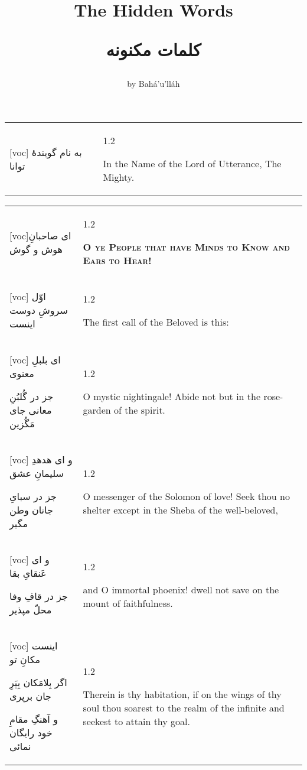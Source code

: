 \documentclass[11pt]{article}
\title{
\Huge
\vspace*{2in}
The Hidden Words \\
\vspace{.25in}
\fontsize{48}{36}
\begin{arab}
کلمات مکنونه
\end{arab}
\vspace{1in}}
\author{\LARGE by Bahá’u’lláh}
\date{}
\makeatletter
\newenvironment{orig}
  {\begin{farsi}[voc]}
  {\end{farsi}}
\newenvironment{trans}
  {\Large\begin{spacing}{1.2}\raggedright}
  {\end{spacing}}
\newenvironment{word}
  {\begin{tabular}[t]{p{2.75in}@{\hspace{3em}}p{2.75in}}}
  {\end{tabular}}
\newcommand{\ayat}[2]{\begin{orig}#1\end{orig} & \begin{trans}#2\end{trans}}
\newcommand{\heading}[2]{\textsc{\textbf{#1}} %
}
\makeatother
\begin{document}
\maketitle
\thispagestyle{empty}

\newpage

\fontsize{24}{32}

\vspace*{3in}

\begin{word}
\ayat{
به نام گویندۀ توانا
}{
In the Name of the Lord of Utterance, The Mighty.
}
\end{word}

\pagebreak

\begin{word}
\ayat{ای صاحبانِ هوش و گوش}{\heading{
  O ye People that have Minds to Know and Ears to Hear!}{}} \\ \ayat{
اوّل سروشِ دوست اینست
}{The first call of the Beloved is this:} \vspace{-1ex}\\ \ayat{
ای بلبلِ معنوی

جز در گُلبُنِ معانی جای مَگُزين
}{O mystic nightingale! Abide not but in the rose-garden of the spirit.} \\ \ayat{
و ای هدهدِ سلیمانِ عشق

جز در سبایِ جانان وطن مگیر
}{O messenger of the Solomon of love! Seek thou no shelter except in the Sheba
  of the well-beloved,} \vspace{-1ex}\\ \ayat{
و ای عَنقایِ بقا

جز در قافِ وفا محلّ مپذیر
}{and O immortal phoenix! dwell not save on the mount of faithfulness.} \\ \ayat{
اینست مکانِ تو

اگر بِلامَکان بِپَرِ جان برپری

و آهنگِ مقامِ خود رایگان نمائی
}{Therein is thy habitation, if on the wings of thy soul thou soarest to the
  realm of the infinite and seekest to attain thy goal.}
\end{word}

\newpage
\end{document}
